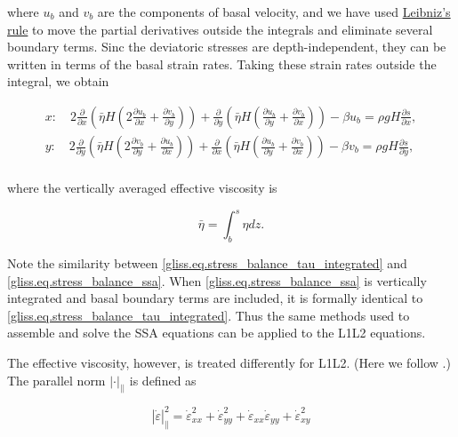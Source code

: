 {\noindent
where $u_b$ and $v_b$ are the components of basal velocity, and we have used
\href{http://en.wikipedia.org/wiki/Leibniz_integral_rule}{Leibniz's rule}
to move the partial derivatives outside the integrals and eliminate several boundary terms.
Sinc the deviatoric stresses are depth-independent, they can be written in terms of the
basal strain rates. Taking these strain rates outside the integral, we obtain

\begin{equation}
  \label{gliss.eq.stress_balance_tau_integrated}
  \begin{split}
    x: \quad 2 \frac{\partial }{\partial x} \left( \bar{\eta}H \left( 2 \frac{\partial u_b}{\partial x} + \frac{\partial v_b}{\partial y} \right) \right)
             + \frac{\partial }{\partial y} \left( \bar{\eta}H \left(   \frac{\partial u_b}{\partial y} + \frac{\partial v_b}{\partial x} \right) \right)
             - \beta u_b = \rho g H \frac{\partial s}{\partial x}, \\
    y: \quad 2 \frac{\partial }{\partial y} \left( \bar{\eta}H \left( 2 \frac{\partial v_b}{\partial y} + \frac{\partial u_b}{\partial x} \right) \right)
             + \frac{\partial }{\partial x} \left( \bar{\eta}H \left(   \frac{\partial u_b}{\partial y} + \frac{\partial v_b}{\partial x} \right) \right)
             - \beta v_b = \rho g H \frac{\partial s}{\partial y}, \\
  \end{split}
\end{equation}

\noindent
where the vertically averaged effective viscosity is

\begin{equation}
  \bar{\eta} = \int_b^s {\eta dz}.
\end{equation}

\noindent
Note the similarity between \eqref{gliss.eq.stress_balance_tau_integrated} and \eqref{gliss.eq.stress_balance_ssa}.
When \eqref{gliss.eq.stress_balance_ssa} is vertically integrated and basal boundary terms are included,
it is formally identical to \eqref{gliss.eq.stress_balance_tau_integrated}.  Thus the same methods used to
assemble and solve the SSA equations can be applied to the L1L2 equations.

The effective viscosity, however, is treated differently for L1L2.
(Here we follow \citet{Perego2012}.)
The parallel norm $\left| \cdot \right|_{||}$ is defined as

\begin{equation}
  \label{gliss.eq.L1L2_parallel_norm}
  \left| {\dot{\varepsilon }} \right|_{\parallel}^{2} = 
  \dot{\varepsilon }_{xx}^{2} + \dot{\varepsilon }_{yy}^{2} + {{\dot{\varepsilon }}_{xx}}{{\dot{\varepsilon }}_{yy}} + \dot{\varepsilon }_{xy}^{2}
\end{equation}

}
